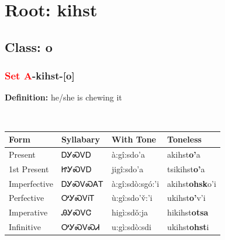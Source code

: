 \needspace{4in}
\section*{Root: kihst}
\nopagebreak
{}
\needspace{3in}
\subsection*{Class: o}
\nopagebreak
\needspace{2in}
\subsubsection*{\textcolor{Red}{Set A}{-}\textbf{kihst}{-}[o]}
\nopagebreak
\textbf{Definition: } he/she is chewing it
\\[0.5em]
\begin{tabularx}{\textwidth}{l X X X}%
\toprule%
\textbf{Form}&\textbf{Syllabary}&\textbf{With Tone}&\textbf{Toneless}\\%
\midrule%
Present&ᎠᎩᏍᏙᎠ&à:gî:sdo’a&akihst\textbf{o'}a\\%
1st Present&ᏥᎩᏍᏙᎠ&jigî:sdo’a&tsikihst\textbf{o'}a\\%
Imperfective&ᎠᎩᏍᏙᏍᎪᎢ&à:gî:sdò:sgó:’i&akihst\textbf{ohsk}o'i\\%
Perfective&ᎤᎩᏍᏙᎥᎢ&ù:gî:sdo’v̌:’i&ukihst\textbf{o'}v'i\\%
Imperative&ᎯᎩᏍᏙᏣ&higì:sdǒ:ja&hikihst\textbf{otsa}\\%
Infinitive&ᎤᎩᏍᏙᏍᏗ&u:gì:sdò:sdi&ukihst\textbf{ohst}i\\%
\bottomrule%
\end{tabularx}
\\[1em]